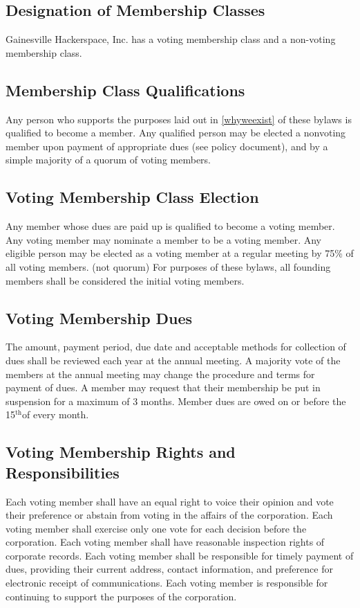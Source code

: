 \documentclass[10pt,letterpaper,titlepage]{article}
\newcommand\corpname{Gainesville Hackerspace, Inc.}
\newcommand{\superscript}[1]{\ensuremath{^{\textrm{#1}}}}
\renewcommand{\th}[0]{\superscript{th}}
\begin{document}
\subsection{Designation of Membership Classes}
 
\corpname{} has a voting membership class and a non-voting membership class. 

\subsection{Membership Class Qualifications}
 
Any person who supports the purposes laid out in \ref{whyweexist} of
these bylaws is qualified to become a member.  Any qualified person
may be elected a nonvoting member upon payment of appropriate dues
(see policy document), and by a simple majority of a quorum of voting
members.


\subsection{Voting Membership Class Election}
 
Any member whose dues are paid up is qualified to become a voting
member.  Any voting member may nominate a member to be a voting
member.  Any eligible person may be elected as a voting member at a
regular meeting by 75\% of all voting members.  (not quorum)
For purposes of these bylaws, all founding members shall be considered
the initial voting members.


\subsection{Voting Membership Dues}
\label{votmemdue}
 
The amount, payment period, due date and acceptable methods for collection of
dues shall be reviewed each year at the annual meeting.
A majority vote of the members at the annual meeting may change the procedure
and terms for payment of dues.
A member may request that their membership be put in suspension for a maximum
of 3 months.
Member dues are owed on or before the 15\th of every month.

\subsection{Voting Membership Rights and Responsibilities}
 
Each voting member shall have an equal right to voice their opinion and vote
their preference or abstain from voting in the affairs of the corporation.
Each voting member shall exercise only one vote for each decision before the
corporation.
Each voting member shall have reasonable inspection rights of corporate
records.
Each voting member shall be responsible for timely payment of dues, providing
their current address, contact information, and preference for electronic
receipt of communications.
Each voting member is responsible for continuing to support the purposes of the
corporation.
\end{document}
